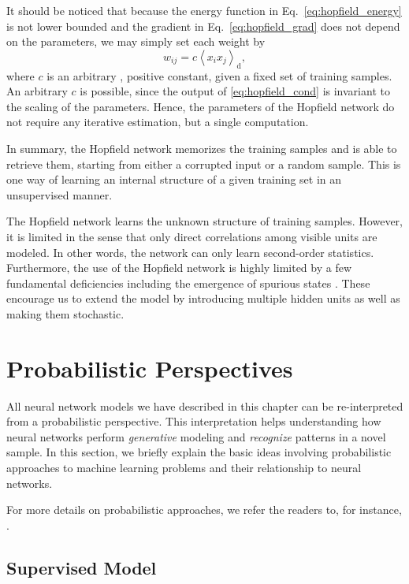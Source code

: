 \documentclass[dissertation,nocontribution,draft*]{aaltoseries}
\newcommand{\td}[0]{\text{d}}
\begin{document}
It should be noticed that because the energy function in
Eq.~\eqref{eq:hopfield_energy} is not lower bounded and the
gradient in Eq.~\eqref{eq:hopfield_grad} does not depend on
the parameters, we may simply set each weight by
\[
w_{ij} = c \left< x_i x_j \right>_\td,
\]
where $c$ is an arbitrary
, positive constant, given a fixed
set of training samples. An arbitrary $c$ is possible, since
the output of \eqref{eq:hopfield_cond} is invariant to the
scaling of the parameters. Hence, the parameters of the
Hopfield network do not require any iterative estimation,
but a single computation.

In summary, the Hopfield network memorizes the training
samples and is able to retrieve them, starting from either a
corrupted input or a random sample. This is one way of
learning an internal structure of a given training set in an
unsupervised manner.

The Hopfield network learns the unknown structure of
training samples. However, it is limited in the sense that
only direct correlations among visible units are modeled. In
other words, the network can only learn second-order
statistics. Furthermore, the use of the Hopfield network is
highly limited by a few fundamental deficiencies including the emergence
of spurious states \citep[for more details,
see][]{Haykin2009}. These encourage us to extend the
model by introducing multiple hidden units as well as
making them stochastic.

\section{Probabilistic Perspectives}
\label{sec:prob_perspective}

All neural network models we have described in this chapter
can be re-interpreted from a probabilistic perspective. This
interpretation helps understanding how neural networks
perform \textit{generative} modeling and \textit{recognize}
patterns in a novel sample.  In this section, we briefly
explain the basic ideas involving probabilistic approaches
to machine learning problems and their relationship to neural
networks.

For more details on probabilistic approaches, we refer
the readers to, for instance, \citep{Murphy2012,Barber2012,Bishop2006}. 

\subsection{Supervised Model}
\end{document}
